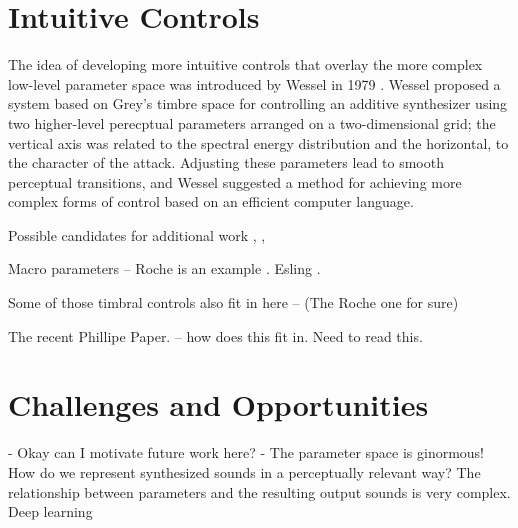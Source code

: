 

\section{Intuitive Controls}
The idea of developing more intuitive controls that overlay the more complex low-level parameter space was introduced by Wessel in 1979 \cite{wessel1979timbre}. Wessel proposed a system based on Grey's timbre space \cite{grey1977multidimensional} for controlling an additive synthesizer using two higher-level perecptual parameters arranged on a two-dimensional grid; the vertical axis was related to the spectral energy distribution and the horizontal, to the character of the attack. Adjusting these parameters lead to smooth perceptual transitions, and Wessel suggested a method for achieving more complex forms of control based on an efficient computer language.

Possible candidates for additional work \cite{dahlstedt2001creating}, \cite{arfib2002strategies}, \cite{huang2014active}

Macro parameters -- Roche is an example \cite{roche2021make}. Esling \cite{esling2019universal}. 

Some of those timbral controls also fit in here -- (The Roche one for sure) 

The recent Phillipe Paper. \cite{tatar2021latent} -- how does this fit in. Need to read this.

 




\section{Challenges and Opportunities}
- Okay can I motivate future work here?
- The parameter space is ginormous! How do we represent synthesized sounds in a perceptually relevant way? The relationship between parameters and the resulting output sounds is very complex. Deep learning 

